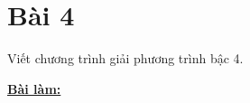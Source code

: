\section*{Bài 4}

Viết chương trình giải phương trình bậc 4.
	

\centering
\textbf{\underline{Bài làm:}}

	
\clearpage